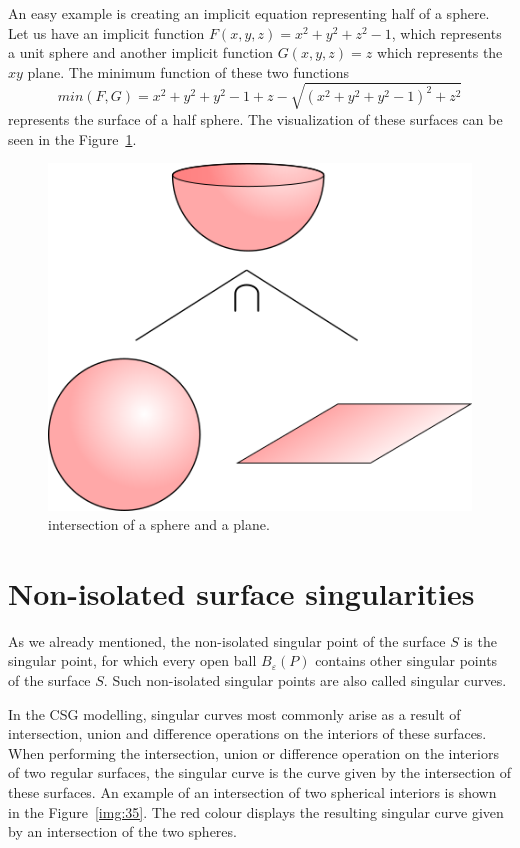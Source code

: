 An easy example is creating an implicit equation representing half of
a sphere. Let us have an implicit function 
$F(x, y, z) = x^2+y^2+z^2-1$, which represents a unit sphere and another
implicit function $G(x, y, z) = z$ which represents the $xy$ plane.
The minimum function of these two functions
$$min(F, G) = x^2+y^2+y^2-1+z-\sqrt{(x^2+y^2+y^2-1)^2+z^2}$$ represents the
surface of a half sphere. The visualization of these surfaces can be seen in
the Figure~\ref{img:20}.
\begin{figure}
    \centerline{\includegraphics[scale=0.5]{images/img20}}
    \caption[Intersection of a sphere and a plane]
    {intersection of a sphere and a plane.}
    \label{img:20}
\end{figure}


\section{Non-isolated surface singularities}
\label{sub2.3}

As we already mentioned, the non-isolated singular point of the surface $S$ is 
the singular point, for which
every open ball $B_\varepsilon(P)$ contains other singular points of the surface $S$.
Such non-isolated singular points are also called singular curves.

In the CSG modelling, singular curves most commonly arise as a result of intersection,
union and difference operations on the interiors of these surfaces. When performing
the intersection, union or difference operation on the interiors of two regular surfaces, 
the singular curve is the curve given by the intersection of these surfaces. An example
of an intersection of two spherical interiors is shown in the Figure~\ref{img:35}. The red colour displays the resulting singular curve given by an intersection of the two spheres.

